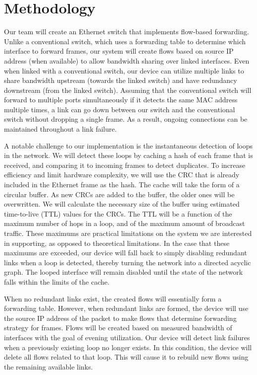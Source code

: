 \section{Methodology}
\label{sec:methodology}
	Our team will create an Ethernet switch that implements flow-based forwarding.
	Unlike a conventional switch, which uses a forwarding table to determine which interface to forward frames, our system will create flows based on source IP address (when available) to allow bandwidth sharing over linked interfaces.
	Even when linked with a conventional switch, our device can utilize multiple links to share bandwidth upstream (towards the linked switch) and have redundancy downstream (from the linked switch).
	Assuming that the conventional switch will forward to multiple ports simultaneously if it detects the same MAC address multiple times, a link can go down between our switch and the conventional switch without dropping a single frame.
	As a result, ongoing connections can be maintained throughout a link failure.

	A notable challenge to our implementation is the instantaneous detection of loops in the network.
	We will detect these loops by caching a hash of each frame that is received, and comparing it to incoming frames to detect duplicates.
	To increase efficiency and limit hardware complexity, we will use the CRC that is already included in the Ethernet frame as the hash.
	The cache will take the form of a circular buffer.
	As new CRCs are added to the buffer, the older ones will be overwritten.
	We will calculate the necessary size of the buffer using estimated time-to-live (TTL) values for the CRCs.
	The TTL will be a function of the maximum number of hops in a loop, and of the maximum amount of broadcast traffic.
	These maximums are practical limitations on the system we are interested in supporting, as opposed to theoretical limitations.
	In the case that these maximums are exceeded, our device will fall back to simply disabling redundant links when a loop is detected, thereby turning the network into a directed acyclic graph.
	The looped interface will remain disabled until the state of the network falls within the limits of the cache.
	
	When no redundant links exist, the created flows will essentially form a forwarding table.
	However, when redundant links are formed, the device will use the source IP address of the packet to make flows that determine forwarding strategy for frames.
	Flows will be created based on measured bandwidth of interfaces with the goal of evening utilization.
	Our device will detect link failures when a previously existing loop no longer exists.
	In this condition, the device will delete all flows related to that loop.
	This will cause it to rebuild new flows using the remaining available links.

